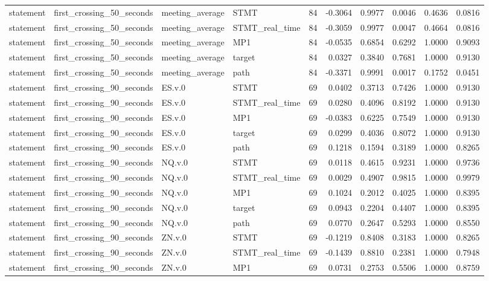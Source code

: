 \begin{tabular}{llllrrrrrr}
statement & first_crossing_50_seconds & meeting_average & STMT & 84 & -0.3064 & 0.9977 & 0.0046 & 0.4636 & 0.0816 \\
statement & first_crossing_50_seconds & meeting_average & STMT_real_time & 84 & -0.3059 & 0.9977 & 0.0047 & 0.4664 & 0.0816 \\
statement & first_crossing_50_seconds & meeting_average & MP1 & 84 & -0.0535 & 0.6854 & 0.6292 & 1.0000 & 0.9093 \\
statement & first_crossing_50_seconds & meeting_average & target & 84 & 0.0327 & 0.3840 & 0.7681 & 1.0000 & 0.9130 \\
statement & first_crossing_50_seconds & meeting_average & path & 84 & -0.3371 & 0.9991 & 0.0017 & 0.1752 & 0.0451 \\
statement & first_crossing_90_seconds & ES.v.0 & STMT & 69 & 0.0402 & 0.3713 & 0.7426 & 1.0000 & 0.9130 \\
statement & first_crossing_90_seconds & ES.v.0 & STMT_real_time & 69 & 0.0280 & 0.4096 & 0.8192 & 1.0000 & 0.9130 \\
statement & first_crossing_90_seconds & ES.v.0 & MP1 & 69 & -0.0383 & 0.6225 & 0.7549 & 1.0000 & 0.9130 \\
statement & first_crossing_90_seconds & ES.v.0 & target & 69 & 0.0299 & 0.4036 & 0.8072 & 1.0000 & 0.9130 \\
statement & first_crossing_90_seconds & ES.v.0 & path & 69 & 0.1218 & 0.1594 & 0.3189 & 1.0000 & 0.8265 \\
statement & first_crossing_90_seconds & NQ.v.0 & STMT & 69 & 0.0118 & 0.4615 & 0.9231 & 1.0000 & 0.9736 \\
statement & first_crossing_90_seconds & NQ.v.0 & STMT_real_time & 69 & 0.0029 & 0.4907 & 0.9815 & 1.0000 & 0.9979 \\
statement & first_crossing_90_seconds & NQ.v.0 & MP1 & 69 & 0.1024 & 0.2012 & 0.4025 & 1.0000 & 0.8395 \\
statement & first_crossing_90_seconds & NQ.v.0 & target & 69 & 0.0943 & 0.2204 & 0.4407 & 1.0000 & 0.8395 \\
statement & first_crossing_90_seconds & NQ.v.0 & path & 69 & 0.0770 & 0.2647 & 0.5293 & 1.0000 & 0.8550 \\
statement & first_crossing_90_seconds & ZN.v.0 & STMT & 69 & -0.1219 & 0.8408 & 0.3183 & 1.0000 & 0.8265 \\
statement & first_crossing_90_seconds & ZN.v.0 & STMT_real_time & 69 & -0.1439 & 0.8810 & 0.2381 & 1.0000 & 0.7948 \\
statement & first_crossing_90_seconds & ZN.v.0 & MP1 & 69 & 0.0731 & 0.2753 & 0.5506 & 1.0000 & 0.8759 \\

\end{tabular}

